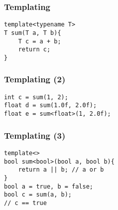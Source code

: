 
\begin{frame}
\end{frame}

%

\begin{frame}[fragile]
\frametitle{Templating}
\begin{lstlisting}
template<typename T>
T sum(T a, T b){
    T c = a + b;
    return c;
}
\end{lstlisting}
\end{frame}

\begin{frame}[fragile]
\frametitle{Templating (2)}
\begin{lstlisting}
int c = sum(1, 2);
float d = sum(1.0f, 2.0f);
float e = sum<float>(1, 2.0f);
\end{lstlisting}
\end{frame}

\begin{frame}[fragile]
\frametitle{Templating (3)}
\begin{lstlisting}
template<>
bool sum<bool>(bool a, bool b){
    return a || b; // a or b
}
bool a = true, b = false;
bool c = sum(a, b);
// c == true
\end{lstlisting}
\end{frame}